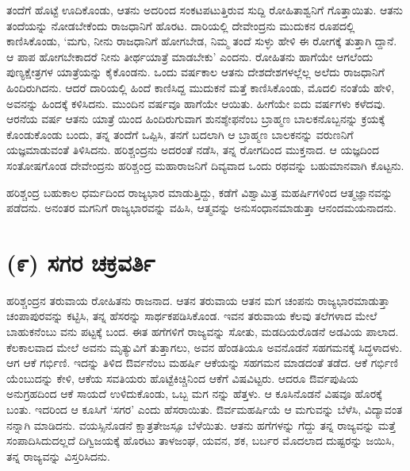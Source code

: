ತಂದೆಗೆ ಹೊಟ್ಟೆ ಊದಿಕೊಂಡು, ಆತನು ಅದರಿಂದ ಸಂಕಟಪಟುತ್ತಿರುವ ಸುದ್ದಿ ರೋಹಿತಾಶ್ವನಿಗೆ ಗೊತ್ತಾಯಿತು. ಆತನು ತಂದೆಯನ್ನು ನೋಡಬೇಕೆಂದು ರಾಜಧಾನಿಗೆ ಹೊರಟ. ದಾರಿಯಲ್ಲಿ ದೇವೇಂದ್ರನು ಮುದುಕನ ರೂಪದಲ್ಲಿ ಕಾಣಿಸಿಕೊಂಡು, ‘ಮಗು, ನೀನು ರಾಜಧಾನಿಗೆ ಹೋಗಬೇಡ, ನಿಮ್ಮ ತಂದೆ ಸುಳ್ಳು ಹೇಳಿ ಈ ರೋಗಕ್ಕೆ ತುತ್ತಾಗಿ ದ್ದಾನೆ. ಆ ಪಾಪ ಹೋಗಬೇಕಾದರೆ ನೀನು ತೀರ್ಥಯಾತ್ರೆ ಮಾಡಬೇಕು’ ಎಂದನು. ರೋಹಿತನು ಹಾಗೆಯೇ ಆಗಲೆಂದು ಪುಣ್ಯಕ್ಷೇತ್ರಗಳ ಯಾತ್ರೆಯನ್ನು ಕೈಕೊಂಡನು. ಒಂದು ವರ್ಷಕಾಲ ಆತನು ದೇಶದೇಶಗಳಲ್ಲೆಲ್ಲ ಅಲೆದು ರಾಜಧಾನಿಗೆ ಹಿಂದಿರುಗಿದನು. ಆದರೆ ದಾರಿಯಲ್ಲಿ ಹಿಂದೆ ಕಾಣಿಸಿದ್ದ ಮುದುಕನೆ ಮತ್ತೆ ಕಾಣಿಸಿಕೊಂಡು, ಮೊದಲಿ ನಂತೆಯೆ ಹೇಳಿ, ಅವನನ್ನು ಹಿಂದಕ್ಕೆ ಕಳಿಸಿದನು. ಮುಂದಿನ ವರ್ಷವೂ ಹಾಗೆಯೇ ಆಯಿತು. ಹೀಗೆಯೇ ಐದು ವರ್ಷಗಳು ಕಳೆದವು. ಆರನೆಯ ವರ್ಷ ಆತನು ಯಾತ್ರೆ ಯಿಂದ ಹಿಂದಿರುಗುವಾಗ ಶುನಶ್ಶೇಫನೆಂಬ ಬ್ರಾಹ್ಮಣ ಬಾಲಕನೊಬ್ಬನನ್ನು ಕ್ರಯಕ್ಕೆ ಕೊಂಡುಕೊಂಡು ಬಂದು, ತನ್ನ ತಂದೆಗೆ ಒಪ್ಪಿಸಿ, ತನಗೆ ಬದಲಾಗಿ ಆ ಬ್ರಾಹ್ಮಣ ಬಾಲಕನನ್ನು ವರುಣನಿಗೆ ಯಜ್ಞಮಾಡುವಂತೆ ತಿಳಿಸಿದನು. ಹರಿಶ್ಚಂದ್ರನು ಅದರಂತೆ ನಡೆಸಿ, ತನ್ನ ರೋಗದಿಂದ ಮುಕ್ತನಾದ. ಆ ಯಜ್ಞದಿಂದ ಸಂತೋಷಗೊಂಡ ದೇವೇಂದ್ರನು ಹರಿಶ್ಚಂದ್ರ ಮಹಾರಾಜನಿಗೆ ದಿವ್ಯವಾದ ಒಂದು ರಥವನ್ನು ಬಹುಮಾನವಾಗಿ ಕೊಟ್ಟನು.

ಹರಿಶ್ಚಂದ್ರ ಬಹುಕಾಲ ಧರ್ಮದಿಂದ ರಾಜ್ಯಭಾರ ಮಾಡುತ್ತಿದ್ದು, ಕಡೆಗೆ ವಿಶ್ವಾಮಿತ್ರ ಮಹರ್ಷಿಗಳಿಂದ ಆತ್ಮಜ್ಞಾನವನ್ನು ಪಡೆದನು. ಅನಂತರ ಮಗನಿಗೆ ರಾಜ್ಯಭಾರವನ್ನು ವಹಿಸಿ, ಆತ್ಮವನ್ನು ಅನುಸಂಧಾನಮಾಡುತ್ತಾ ಆನಂದಮಯನಾದನು.


\section{(೯) ಸಗರ ಚಕ್ರವರ್ತಿ}

ಹರಿಶ್ಚಂದ್ರನ ತರುವಾಯ ರೋಹಿತನು ರಾಜನಾದ. ಆತನ ತರುವಾಯ ಆತನ ಮಗ ಚಂಪನು ರಾಜ್ಯಭಾರಮಾಡುತ್ತಾ ಚಂಪಾಪುರವನ್ನು ಕಟ್ಟಿಸಿ, ತನ್ನ ಹೆಸರನ್ನು ಸಾರ್ಥಕಪಡಿಸಿಕೊಂಡ. ಇವನ ತರುವಾಯ ಕೆಲವು ತಲೆಗಳಾದ ಮೇಲೆ ಬಾಹುಕನೆಂಬು ವನು ಪಟ್ಟಕ್ಕೆ ಬಂದ. ಈತ ಹಗೆಗಳಿಗೆ ರಾಜ್ಯವನ್ನು ಸೋತು, ಮಡದಿಯರೊಡನೆ ಅಡವಿಯ ಪಾಲಾದ. ಕೆಲಕಾಲವಾದ ಮೇಲೆ ಅವನು ಮೃತ್ಯುವಿಗೆ ತುತ್ತಾಗಲು, ಅವನ ಹೆಂಡತಿಯೂ ಅವನೊಡನೆ ಸಹಗಮನಕ್ಕೆ ಸಿದ್ಧಳಾದಳು. ಆಗ ಆಕೆ ಗರ್ಭಿಣಿ. ಇದನ್ನು ತಿಳಿದ ಔರ್ವನೆಂಬ ಮಹರ್ಷಿ ಆಕೆಯನ್ನು ಸಹಗಮನ ಮಾಡದಂತೆ ತಡೆದ. ಆಕೆ ಗರ್ಭಿಣಿ ಯೆಂಬುದನ್ನು ಕೇಳಿ, ಆಕೆಯ ಸವತಿಯರು ಹೊಟ್ಟೆಕಿಚ್ಚಿನಿಂದ ಆಕೆಗೆ ವಿಷವಿಟ್ಟರು. ಆದರೂ ಔರ್ವಪುಷಿಯ ಅನುಗ್ರಹದಿಂದ ಆಕೆ ಸಾಯದೆ ಉಳಿದುಕೊಂಡು, ಒಬ್ಬ ಮಗ ನನ್ನು ಹೆತ್ತಳು. ಆ ಕೂಸಿನೊಡನೆ ವಿಷವೂ ಹೊರಕ್ಕೆ ಬಂತು. ಇದರಿಂದ ಆ ಕೂಸಿಗೆ ‘ಸಗರ’ ಎಂದು ಹೆಸರಾಯಿತು. ಔರ್ವಮಹರ್ಷಿಯೆ ಆ ಮಗುವನ್ನು ಬೆಳೆಸಿ, ವಿದ್ಯಾವಂತ ನನ್ನಾಗಿ ಮಾಡಿದನು. ವಯಸ್ಸಿನೊಡನೆ ಕ್ಷಾತ್ರತೇಜಸ್ಸೂ ಬೆಳೆಯಿತು. ಆತನು ಹಗೆಗಳನ್ನು ಗೆದ್ದು ತನ್ನ ರಾಜ್ಯವನ್ನು ಮತ್ತೆ ಸಂಪಾದಿಸಿದುದಲ್ಲದೆ ದಿಗ್ವಿಜಯಕ್ಕೆ ಹೊರಟು ತಾಳಜಂಘ, ಯವನ, ಶಕ, ಬರ್ಬರ ಮೊದಲಾದ ದುಷ್ಟರನ್ನು ಜಯಿಸಿ, ತನ್ನ ರಾಜ್ಯವನ್ನು ವಿಸ್ತರಿಸಿದನು.

